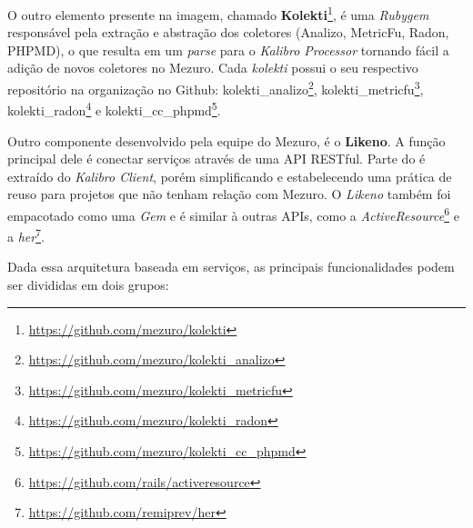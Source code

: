 O outro elemento presente na imagem, chamado \textbf{Kolekti}\footnote{\url{https://github.com/mezuro/kolekti}},
é uma \textit{Rubygem} responsável pela extração e abstração dos coletores
(Analizo, MetricFu, Radon, PHPMD), o que resulta em um \textit{parse} para o
\textit{Kalibro Processor} tornando fácil a adição de novos coletores no Mezuro.
Cada \textit{kolekti} possui o seu respectivo repositório na organização no
Github: kolekti\_analizo\footnote{\url{https://github.com/mezuro/kolekti\_analizo}},
kolekti\_metricfu\footnote{\url{https://github.com/mezuro/kolekti\_metricfu}},
kolekti\_radon\footnote{\url{https://github.com/mezuro/kolekti\_radon}} e
kolekti\_cc\_phpmd\footnote{\url{https://github.com/mezuro/kolekti\_cc\_phpmd}}.

Outro componente desenvolvido pela equipe do Mezuro, é o \textbf{Likeno}. A
função principal dele é conectar serviços através de uma API RESTful. Parte do
é extraído do \textit{Kalibro Client}, porém simplificando e estabelecendo uma
prática de reuso para projetos que não tenham relação com Mezuro. O
\textit{Likeno} também foi empacotado como uma \textit{Gem} e é similar à outras
APIs, como a \textit{ActiveResource}\footnote{\url{https://github.com/rails/activeresource}}
e a \textit{her}\footnote{\url{https://github.com/remiprev/her}}.

Dada essa arquitetura baseada em serviços, as principais funcionalidades podem
ser divididas em dois grupos:

